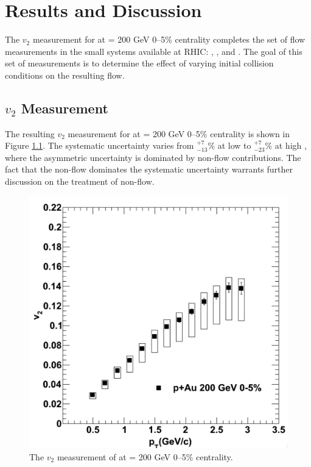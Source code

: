 \chapter{Results and Discussion}
The $v_2$ measurement for \pau at \sqsn = 200 GeV 0--5\% centrality completes the set of flow measurements in the small systems available at RHIC: \pau, \dau, and \hau. The goal of this set of measurements is to determine the effect of varying initial collision conditions on the resulting flow.
\section{$v_2$ Measurement}
The resulting $v_2$ measurement for \pau at \sqsn = 200 GeV 0--5\% centrality is shown in Figure \ref{fig:pau_points_alone}. The systematic uncertainty varies from $^{+7}_{-13}\%$ at low \pt to $^{+7}_{-23}\%$ at high \pt, where the asymmetric uncertainty is dominated by non-flow contributions. The fact that the non-flow dominates the systematic uncertainty warrants further discussion on the treatment of non-flow.

\begin{figure}[!ht]
\begin{center}
\includegraphics[width=0.65\linewidth]{figs/pau_points.png}
\caption{The $v_2$ measurement of \pau at \sqsn =  200 GeV 0--5\% centrality.}
\label{fig:pau_points_alone}
\end{center}
\end{figure}

